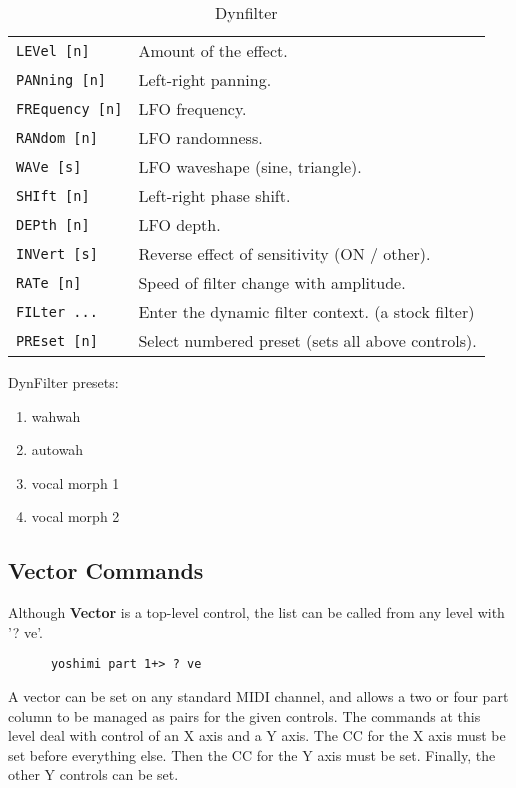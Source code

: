    \begin{table}[H]
      \centering
      \caption{Dynfilter}
      \begin{tabular}{l l}
\texttt{LEVel [n]} &
   Amount of the effect. \\
\texttt{PANning [n]} &
   Left-right panning. \\
\texttt{FREquency [n]} &
   LFO frequency. \\
\texttt{RANdom [n]} &
   LFO randomness. \\
\texttt{WAVe [s]} &
   LFO waveshape (sine, triangle). \\
\texttt{SHIft [n]} &
   Left-right phase shift. \\
\texttt{DEPth [n]} &
   LFO depth. \\
\texttt{INVert [s]} &
   Reverse effect of sensitivity (ON / other). \\
\texttt{RATe [n]} &
   Speed of filter change with amplitude. \\
\texttt{FILter ...} &
   Enter the dynamic filter context. (a stock filter)\\
\texttt{PREset [n]} &
   Select numbered preset (sets all above controls). \\
      \end{tabular}
   \end{table}
DynFilter presets:
   \begin{enumerate}
   \item wahwah
   \item autowah
   \item vocal morph 1
   \item vocal morph 2
   \end{enumerate}

\subsection{Vector Commands}
\label{subsec:command_line_vector_command_list}

   Although \textbf{Vector} is a top-level control, the list can be called
   from any level with '? ve'.

   \begin{verbatim}
      yoshimi part 1+> ? ve
   \end{verbatim}
   A vector can be set on any standard MIDI channel, and allows a two or four
   part column to be managed as pairs for the given controls.
   The commands at this level deal with control of an X axis and a Y axis.
   The CC for the X axis must be set before everything else.  Then the CC for
   the Y axis must be set.  Finally, the other Y controls can be set.

